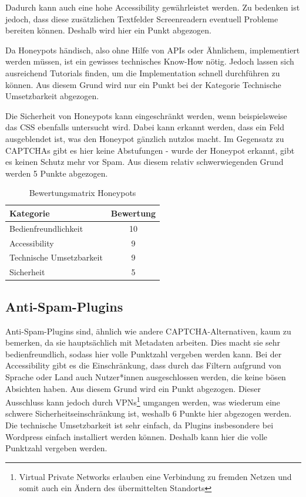 Dadurch kann auch eine hohe Accessibility gewährleistet werden. 
Zu bedenken ist jedoch, dass diese zusätzlichen Textfelder Screenreadern eventuell Probleme bereiten können.
Deshalb wird hier ein Punkt abgezogen.

Da Honeypots händisch, also ohne Hilfe von APIs oder Ähnlichem, implementiert werden müssen, ist ein gewisses technisches Know-How nötig.
Jedoch lassen sich ausreichend Tutorials finden, um die Implementation schnell durchführen zu können.
Aus diesem Grund wird nur ein Punkt bei der Kategorie Technische Umsetzbarkeit abgezogen.

Die Sicherheit von Honeypots kann eingeschränkt werden, wenn beispielsweise das CSS ebenfalls untersucht wird. 
Dabei kann erkannt werden, dass ein Feld ausgeblendet ist, was den Honeypot gänzlich nutzlos macht.
Im Gegensatz zu CAPTCHAs gibt es hier keine Abstufungen - wurde der Honeypot erkannt, gibt es keinen Schutz mehr vor Spam.
Aus diesem relativ schwerwiegenden Grund werden 5 Punkte abgezogen.

\begin{table}[h!]
    \caption{Bewertungsmatrix Honeypots}
    \begin{center}
        \begin{tabular}{l|c}
            Kategorie                       & Bewertung \\\hline
            Bedienfreundlichkeit            & 10         \\
            Accessibility                   & 9        \\
            Technische Umsetzbarkeit        & 9         \\
            Sicherheit                      & 5         
        \end{tabular}
    \end{center}
\end{table}

\subsection{Anti-Spam-Plugins}
Anti-Spam-Plugins sind, ähnlich wie andere CAPTCHA-Alternativen, kaum zu bemerken, da sie hauptsächlich mit Metadaten arbeiten.
Dies macht sie sehr bedienfreundlich, sodass hier volle Punktzahl vergeben werden kann.
Bei der Accessibility gibt es die Einschränkung, dass durch das Filtern aufgrund von Sprache oder Land auch Nutzer*innen ausgeschlossen werden,
die keine bösen Absichten haben. Aus diesem Grund wird ein Punkt abgezogen.
Dieser Ausschluss kann jedoch durch VPNs\footnote[6]{Virtual Private Networks erlauben eine Verbindung zu fremden Netzen und somit auch ein Ändern des übermittelten Standorts} umgangen werden,
was wiederum eine schwere Sicherheitseinschränkung ist, weshalb 6 Punkte hier abgezogen werden.
Die technische Umsetzbarkeit ist sehr einfach, da Plugins insbesondere bei Wordpress einfach installiert werden können.
Deshalb kann hier die volle Punktzahl vergeben werden.

